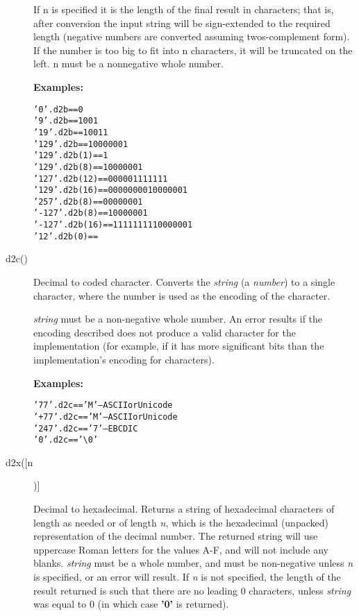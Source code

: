 \begin{description}
If n is specified it is the length of the final result in characters;
that is, after conversion the input string will be sign-extended to
the required length (negative numbers are converted assuming
twos-complement form). If the number is too big to fit into n
characters, it will be truncated on the left. n must be a nonnegative
whole number.

 \textbf{Examples:}
\begin{alltt}
'0'.d2b == 0 
'9'.d2b == 1001 
'19'.d2b == 10011 
'129'.d2b == 10000001 
'129'.d2b(1) == 1 
'129'.d2b(8) == 10000001 
'127'.d2b(12) == 000001111111 
'129'.d2b(16) == 0000000010000001 
'257'.d2b(8) == 00000001 
'-127'.d2b(8) == 10000001 
'-127'.d2b(16) == 1111111110000001 
'12'.d2b(0) == 
\end{alltt}

\item[d2c()]\label{refd2c}
Decimal to coded character.
Converts the \emph{string} (a \nr{} \emph{number}) to a
single character, where the number is used as the encoding of the
character.
 
\emph{string} must be a non-negative whole number.
An error results if the encoding described does not produce a valid
character for the implementation (for example, if it has more
significant bits than the implementation's encoding for characters).
 
\textbf{Examples:}
\begin{alltt}
'77'.d2c  == 'M' -- ASCII or Unicode
'+77'.d2c == 'M' -- ASCII or Unicode
'247'.d2c == '7' -- EBCDIC
'0'.d2c   == '\textbackslash 0'
\end{alltt}
\item[d2x([n])]\label{refd2x}

Decimal to hexadecimal.
Returns a string of hexadecimal characters of length as needed or of
length \emph{n}, which is the hexadecimal (unpacked) representation
of the decimal number.  The returned string will use uppercase
Roman letters for the values A-F, and will not include any blanks.
 \emph{string} must be a whole number, and must be non-negative
unless \emph{n} is specified, or an error will result.
If \emph{n} is not specified, the length of the result returned is
such that there are no leading 0 characters, unless \emph{string}
was equal to 0 (in which case \textbf{'0'} is returned).
 

\end{description}
